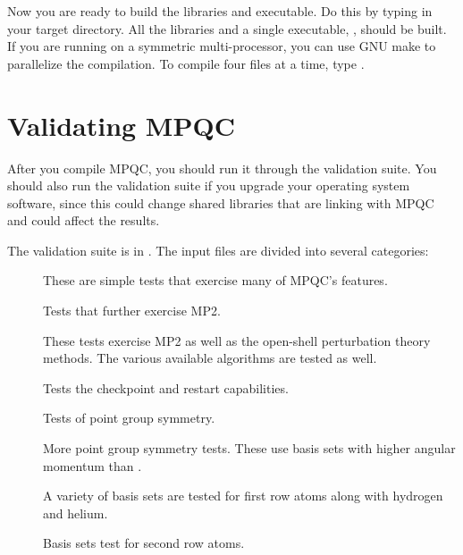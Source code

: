  Now you are ready to build the libraries and executable.  Do this
by typing  in your target directory.  All the libraries and
a single executable, , should be built.
If you are running on a symmetric multi-processor, you can use GNU
make to parallelize the compilation.  To compile four files at a time,
type .

\section{Validating MPQC}

 After you compile MPQC, you should run it through the validation suite.
You should also run the validation suite if you upgrade your operating
system software, since this could change shared libraries that are linking
with MPQC and could affect the results.

 The validation suite is in .  The
input files are divided into several categories:
\begin{description}
  \item[] These are simple tests that exercise many of MPQC's
        features.

  \item[] Tests that further exercise MP2.

  \item[] These tests exercise MP2 as well as the open-shell
        perturbation theory methods.  The various available
        algorithms are tested as well.

  \item[] Tests the checkpoint and restart capabilities.

  \item[] Tests of point group symmetry.

  \item[] More point group symmetry tests.  These use basis
        sets with higher angular momentum than .

  \item[] A variety of basis sets are tested for first row
        atoms along with hydrogen and helium.

  \item[] Basis sets test for second row atoms.

\end{description}

